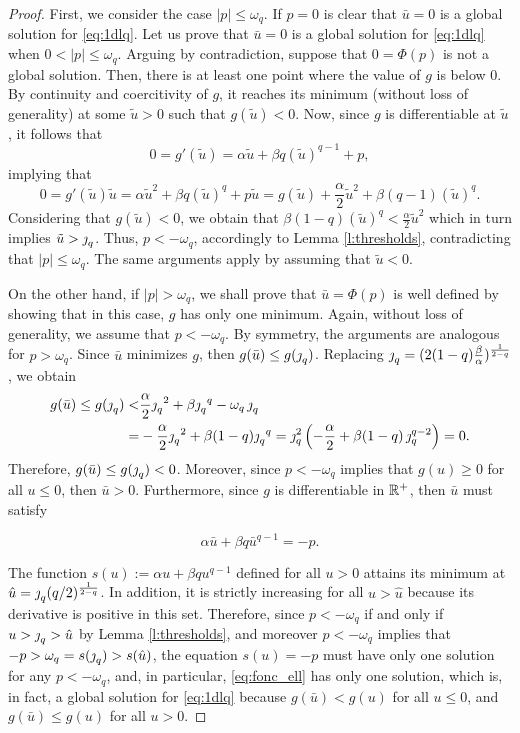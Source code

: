 	\begin{proof}
		First, we consider the case $|p| \leq  \omega_q$. If $p=0$ is clear that $\bar u=0$ is a global solution for \eqref{eq:1dlq}. Let us prove that $\bar u =0$ is a global solution for \eqref{eq:1dlq} when $0<|p|\leq \omega_q$. Arguing by contradiction, suppose that $0 = \Phi(p)$ is not a global solution. Then, there is at least one point where the value of $g$ is below 0. By continuity and coercitivity of $g$, it reaches its minimum (without loss of generality) at some $\tilde u>0$ such that $g(\tilde u) <0$. Now, since $g$ is differentiable at $\tilde u$, it follows that 
		$$ 0 = g'(\tilde u) = \alpha \tilde u + \beta q (\tilde u)^{q-1} + p, $$		
		implying that  $$ 0 = g'(\tilde u)\tilde u = \alpha \tilde u^2 + \beta q (\tilde u)^{q} + p\tilde u = g(\tilde u) + \frac{\alpha}{2}\tilde u^2 + \beta (q-1) (\tilde u)^{q}. $$
		Considering that $g(\tilde u)<0$, we obtain that 
		$\beta (1-q) (\tilde u)^{q}<\frac{\alpha}{2}\tilde u^2$ which in turn implies 
		$\tilde u> \operatorname{\jmath}_q$. Thus, $p<-\omega_q$, accordingly to Lemma \ref{l:thresholds}, contradicting that $|p|\leq \omega_q$. The same arguments apply by assuming that $\tilde u<0$.
		
		On the other hand, if $|p|>\omega_q$, we shall prove that $\bar u = \Phi(p)$ is well defined by showing that in this case, $g$ has only one minimum.  Again, without loss of generality, we assume that $p<-\omega_q$. By symmetry, the arguments are analogous for $p>\omega_q$. Since $\bar u$ minimizes $g$, then $g(\bar u) \leq g(\operatorname{\jmath}_q)$. Replacing $\operatorname{\jmath}_q= (2(1-q)\frac{\beta}{\alpha})^{\frac{1}{2-q}}$, we obtain 
		\begin{align*}
			g (\bar u) \leq   g(\operatorname{\jmath}_q) <& \frac{\alpha}{2} {\operatorname{\jmath}_q}^2 + \beta {\operatorname{\jmath}_q}^{q} -\omega_q \operatorname{\jmath}_q\\
			=&-\frac{\alpha}{2} {\operatorname{\jmath}_q}^2 + \beta(1-q) {\operatorname{\jmath}_q}^{q} = \operatorname{\jmath}_q^2\left(-\frac{\alpha}{2}+\beta (1-q)\operatorname{\jmath}_q^{q-2}\right)=0.
		\end{align*} 
		Therefore, $g(\bar u)\le g(\operatorname{\jmath}_q)<0$. Moreover, since 
		$p<-\omega_q$ implies that $g(u)\geq 0$ for all $u\leq 0$, then $\bar u>0$. 
		Furthermore, since $g$ is differentiable in $\mathbb{R}^+$, then $\bar u$ must satisfy 
		
		\begin{equation}\label{eq:fonc_ell}
			\alpha \bar u + \beta q \bar u^{q-1} = -p .
		\end{equation}
		
		The function $s(u):= \alpha   u + \beta q   u^{q-1} $ defined for all $u>0$ 
		attains its minimum at $\hat u = \operatorname{\jmath}_q({q}/{2})^{\frac{1}{2-q}}$. In addition, 
		it is strictly increasing for all  $u> \hat u$ because its derivative
		is positive in this set. Therefore, since $p<-\omega_q$ if and only if $u>\operatorname{\jmath}_q>\hat{u}$ by 
		Lemma \ref{l:thresholds}, and moreover $p<-\omega_q$ implies that $-p>\omega_q=s(\operatorname{\jmath}_q)>s(\hat{u})$, the equation $s(u)=-p$ must have only one solution for any 
		$p<-\omega_q$, and, in particular, \eqref{eq:fonc_ell} has only one solution, which is, 
		in fact, a global solution for \eqref{eq:1dlq} because $g(\bar u)< g(u)$ for all $u\leq 0$, and $g(\bar u)\le g(u)$ 
		for all $u>0$.  
		

\end{proof}
